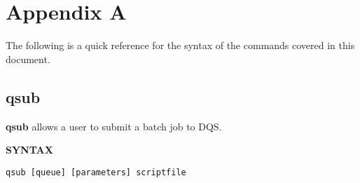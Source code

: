 \section{Appendix A}

The following is a quick reference for the syntax of the commands covered
in this document.

\subsection{qsub}

{\bf qsub} allows a user to submit a batch job to DQS.

{\bf SYNTAX}
\begin{verbatim}
qsub [queue] [parameters] scriptfile
\end{verbatim}

